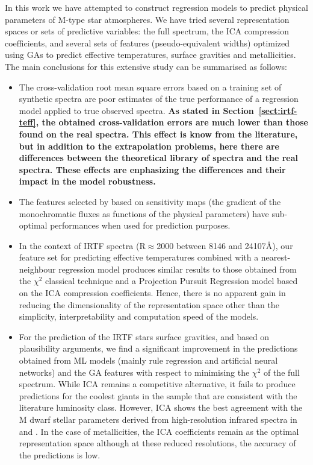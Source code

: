 
In this work we have attempted to construct regression models to
predict physical parameters of M-type star atmospheres. We have tried
several representation spaces or sets of predictive variables: the
full spectrum, the ICA compression coefficients, and several sets of
features (pseudo-equivalent widths) optimized using GAs to predict
effective temperatures, surface gravities and metallicities. The main
conclusions for this extensive study can be summarised as follows:
\begin{itemize}

\item The cross-validation root mean square errors based on a training
  set of synthetic spectra are poor estimates of the true performance
  of a regression model applied to true observed spectra.
      \textbf{
	As stated in Section~\ref{sect:irtf-teff}, the obtained 
	cross-validation errors are much lower than those found on the
	real spectra. This effect is know from the literature, but 
	in addition to the extrapolation problems, 
	here there are differences between the theoretical 
	library of spectra and the real spectra.
	These effects are enphasizing the differences and their
	impact in the model robustness.
      }

\item The features selected by \cite{cesetti} based on sensitivity 
      maps (the gradient of the monochromatic fluxes as functions of the 
      physical parameters) have sub-optimal performances when used 
      for prediction purposes.

\item In the context of IRTF spectra (R$\approx$2000 between 8146 and
  24107\AA), our feature set for predicting effective temperatures
  combined with a nearest-neighbour regression model produces similar
  results to those obtained from the $\chi^2$ classical technique and
  a Projection Pursuit Regression model based on the ICA compression
  coefficients. Hence, there is no apparent gain in reducing the
  dimensionality of the representation space other than the
  simplicity, interpretability and computation speed of the models.

\item For the prediction of the IRTF stars surface gravities, and
  based on plausibility arguments, we find a significant improvement
  in the predictions obtained from ML models (mainly
  rule regression and artificial neural networks) and the GA features
  with respect to minimising the $\chi^2$ of the full spectrum. While
  ICA remains a competitive alternative, it fails to produce
  predictions for the coolest giants in the sample that are consistent
  with the literature luminosity class. However, ICA shows the best
  agreement with the M dwarf stellar parameters derived from
  high-resolution infrared spectra in \cite{esm1} and \cite{esm2}. In
  the case of metallicities, the ICA coefficients remain as the
  optimal representation space although at these reduced resolutions,
  the accuracy of the predictions is low.


\end{itemize}
